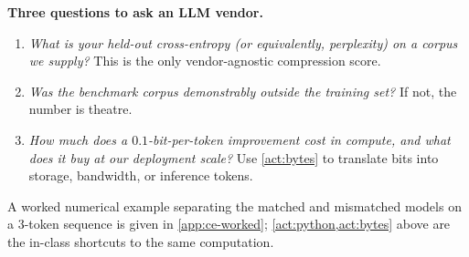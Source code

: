 \begin{decisionbox}
\textbf{Three questions to ask an LLM vendor.}
\begin{enumerate}[leftmargin=*, itemsep=2pt]
  \item \emph{What is your held-out cross-entropy (or equivalently,
        perplexity) on a corpus we supply?}  This is the only
        vendor-agnostic compression score.
  \item \emph{Was the benchmark corpus demonstrably outside the
        training set?}  If not, the number is theatre.
  \item \emph{How much does a $0.1$-bit-per-token improvement cost in
        compute, and what does it buy at our deployment scale?}
        Use \cref{act:bytes} to translate bits into storage,
        bandwidth, or inference tokens.
\end{enumerate}
\end{decisionbox}

A worked numerical example separating the matched and mismatched
models on a $3$-token sequence is given in \cref{app:ce-worked};
\cref{act:python,act:bytes} above are the in-class shortcuts to the
same computation.

